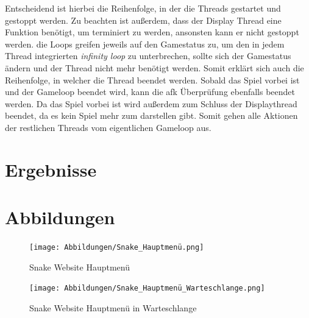 \documentclass[a4paper,12pt]{scrartcl}
\begin{document}
Entscheidend ist hierbei die Reihenfolge, in der die Threads gestartet und gestoppt werden. Zu beachten ist außerdem, dass der Display Thread eine Funktion benötigt, um terminiert zu werden, ansonsten kann er nicht gestoppt werden. die Loops greifen jeweils auf den Gamestatus zu, um den in jedem Thread integrierten \textit{infinity loop} zu unterbrechen, sollte sich der Gamestatus ändern und der Thread nicht mehr benötigt werden. Somit erklärt sich auch die Reihenfolge, in welcher die Thread beendet werden. Sobald das Spiel vorbei ist und der Gameloop beendet wird, kann die afk Überprüfung ebenfalls beendet werden. Da das Spiel vorbei ist wird außerdem zum Schluss der Displaythread beendet, da es kein Spiel mehr zum darstellen gibt. Somit gehen alle Aktionen der restlichen Threads vom eigentlichen Gameloop aus.

\section{Ergebnisse}

\newpage
\section{Abbildungen}

\begin{figure}[!h]
   \begin{minipage}[t]{.4\linewidth}
      \texttt{[image: Abbildungen/Snake\_Hauptmenü.png]}
      \caption{Snake Website Hauptmenü}
      \label{fig:main-menu}
   \end{minipage}
   \hspace{.1\linewidth}%
   \begin{minipage}[t]{.4\linewidth}
      \texttt{[image: Abbildungen/Snake\_Hauptmenü\_Warteschlange.png]}
      \caption{Snake Website Hauptmenü in Warteschlange}
      \label{fig:main-menu-queue}
   \end{minipage}
\end{figure}

\newpage
\end{document}
